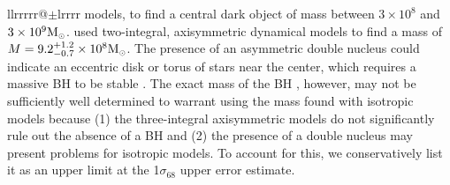 \documentclass[twosided,letterpaper,numberedappendix]{emulateapj}
\newcommand{\msun}     {\ensuremath{{\rm M}_{\scriptscriptstyle \odot}}}
\newcommand{\sigmaconf}   {\ensuremath{\sigma_{68}}}
\begin{document}
\begin{deluxetable}{llrrrrr@{$\pm$}lrrrr}
{models, to
find a central dark object of mass between $3 \times 10^8$ and $3
\times 10^{9} \msun$.   used
two-integral, axisymmetric dynamical models to find a mass of
$M=9.2^{+1.2}_{-0.7}\times10^8 \msun$.  The presence of an asymmetric double
nucleus could indicate an eccentric disk or torus of stars near the
center, which requires a massive BH to be stable
.  
The exact mass of the BH , however,
may not be sufficiently well determined to warrant using the mass found with
isotropic models because (1) the three-integral axisymmetric models do
not significantly rule out the absence of a BH
 and (2) the presence of a double
nucleus may present problems for isotropic models.  To
account for this, we conservatively list it as an upper limit at the
1$\sigmaconf$ upper error estimate.}
%
%
\end{deluxetable}
\end{document}
